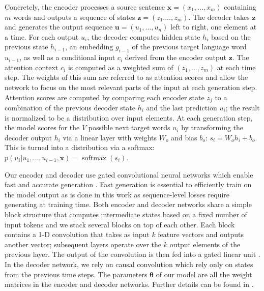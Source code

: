 \documentclass[11pt,a4paper]{article}
\newcommand{\source}{\mathbf{x}}
\newcommand{\sourcetok}{x}
\newcommand{\candhypo}{\mathbf{u}}
\newcommand{\candhypotok}{u}
\begin{document}
Concretely, the encoder processes a source sentence $\source = \left( \sourcetok_1, \dots, \sourcetok_m \right)$ containing $m$ words and outputs a sequence of states $\mathbf{z} = \left( z_1. \dots, z_m \right)$.
The decoder takes $\mathbf{z}$ and generates the output sequence $\candhypo = \left( \candhypotok_1, \dots, \candhypotok_n \right)$ left to right, one element at a time.
For each output $\candhypotok_i$, the decoder computes hidden state $h_i$ based on the previous state $h_{i-1}$, an embedding $g_{i-1}$ of the previous target language word $\candhypotok_{i-1}$, as well as a conditional input $c_i$ derived from the encoder output $\mathbf{z}$.
The attention context $c_i$ is computed as a weighted sum of $\left( z_1, \dots, z_m \right)$ at each time step.
The weights of this sum are referred to as attention scores and allow the network to focus 
on the most relevant parts of the input at each generation step.
Attention scores are computed by comparing each encoder state $z_j$ to a combination of the previous decoder state $h_i$ and the last prediction $\candhypotok_i$;
the result is normalized to be a distribution over input elements.
At each generation step, the model scores for the $V$ possible next target words $\candhypotok_i$ by transforming the decoder output $h_i$ via a linear layer with weights $W_o$ and bias $b_o$: $s_i = W_o h_i + b_o$.
This is turned into a distribution via a softmax:
$p(\candhypotok_i | \candhypotok_1, \dots, \candhypotok_{i-1}, \source) = \operatorname{softmax}(s_i)$.

Our encoder and decoder use gated convolutional neural networks which enable fast and accurate generation \cite{gehring2017icml}. Fast generation is essential to efficiently train on the model output as is done in this work as sequence-level losses require generating at training time.
Both encoder and decoder networks share a simple block structure that computes intermediate states based on a fixed number of input tokens and we stack several blocks on top of each other.
Each block contains a 1-D convolution that takes as input $k$ feature vectors and outputs another vector; subsequent layers operate over the $k$ output elements of the previous layer. The output of the convolution is then fed into a gated linear unit \citep{dauphin2017icml}.
In the decoder network, we rely on causal convolution which rely only on states from the previous time steps. The parameters $\mathbf{\theta}$ of our model are all the weight matrices in the encoder and decoder networks. Further details can be found in \citet{gehring2017icml}.
\end{document}

